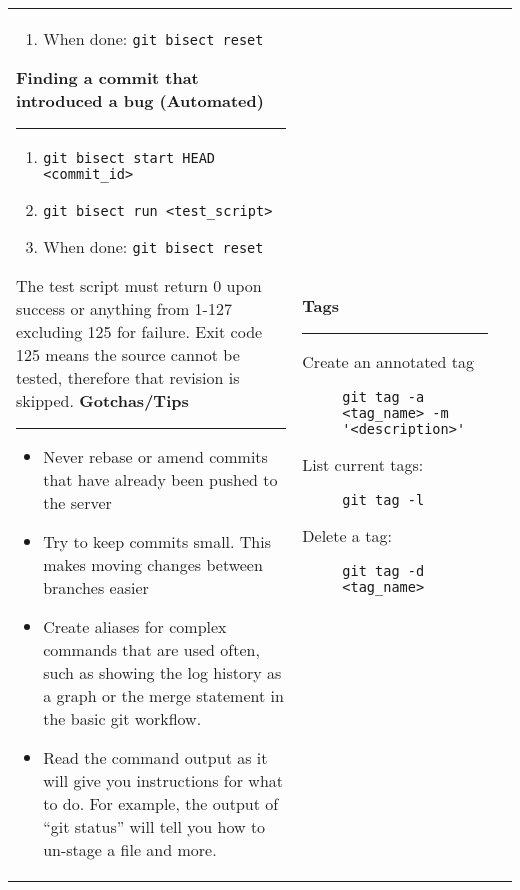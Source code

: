 \documentclass[landscape]{article}
\begin{document}
\begin{tabular*}{10.5in}{|p{2.9in}|p{2.9in}|p{2.9in}|}
\begin{flushleft}
\begin{enumerate}
\begin{itemize}
                \end{itemize}
            \item{When done: \verb!git bisect reset!}
        \end{enumerate}
        \textbf{\large{Finding a commit that introduced a bug (Automated)}}
        \rule{2.9in}{.5pt}
        \small
        \begin{enumerate}
            \item{\verb!git bisect start HEAD <commit_id>!}
            \item{\verb!git bisect run <test_script>!}
            \item{When done: \verb!git bisect reset!}
        \end{enumerate}
        \normalsize{The test script must return 0 upon success or anything
        from 1-127 excluding 125 for failure.  Exit code 125 means the source
        cannot be tested, therefore that revision is skipped.}
        \textbf{\large{Gotchas/Tips}}
        \rule{2.9in}{.5pt}
        \small
        \begin{itemize}
            \item{Never rebase or amend commits that have already been pushed
                to the server}
            \item{Try to keep commits small.  This makes moving changes between
                branches easier}
            \item{Create aliases for complex commands that are used often,
                such as showing the log history as a graph or the merge
                statement in the basic git workflow.}
            \item{Read the command output as it will give you instructions for
                what to do.  For example, the output of ``git status'' will
                tell you how to un-stage a file and more.}
        \end{itemize}
    \end{flushleft}
    &
    \begin{flushleft}
        \textbf{\large{Tags}}
        \rule{2.9in}{.5pt}
        \small
        \begin{description}
            \item[Create an annotated tag]
                {\verb!git tag -a <tag_name> -m '<description>'!}
            \item[List current tags:]
                {\verb!git tag -l!}
            \item[Delete a tag:]
                {\verb!git tag -d <tag_name>!}

\end{description}
\end{flushleft}
\end{tabular*}
\end{document}
